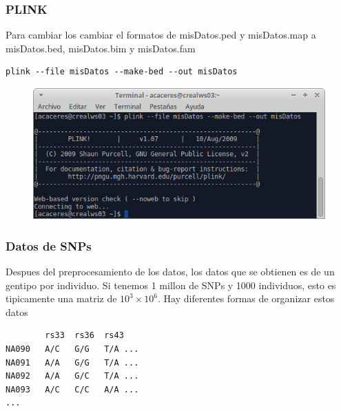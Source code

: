 \documentclass{beamer}\usepackage[]{graphicx}\usepackage[]{color}
\begin{document}
\begin{frame}[fragile]
\frametitle{PLINK}

Para cambiar los cambiar el formatos de misDatos.ped y misDatos.map a misDatos.bed, misDatos.bim y misDatos.fam

\begin{verbatim}
plink --file misDatos --make-bed --out misDatos
\end{verbatim}

\begin{figure}[htbp]
\begin{center}
\includegraphics[width=.8\linewidth]{command.png}
\end{center}
\end{figure}

\end{frame}



\begin{frame}[fragile]
\frametitle{Datos de SNPs}

Despues del preprocesamiento de los datos, los datos que se obtienen es de un gentipo por individuo. Si tenemos 1 millon de SNPs y 1000 individuos, esto es tipicamente una matriz de $10^3 \times 10^6$. Hay diferentes formas de organizar estos datos
 
\begin{verbatim}
        rs33  rs36  rs43
NA090   A/C   G/G   T/A ...
NA091   A/A   G/G   T/A ...
NA092   A/A   G/C   T/A ...
NA093   A/C   C/C   A/A ...
...
\end{verbatim}
\end{frame}
\end{document}
